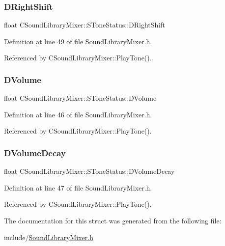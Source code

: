 \subsubsection{\texorpdfstring{D\+Right\+Shift}{DRightShift}}
{\footnotesize\ttfamily float C\+Sound\+Library\+Mixer\+::\+S\+Tone\+Status\+::\+D\+Right\+Shift}



Definition at line 49 of file Sound\+Library\+Mixer.\+h.



Referenced by C\+Sound\+Library\+Mixer\+::\+Play\+Tone().

\hypertarget{structCSoundLibraryMixer_1_1SToneStatus_a95cb65bb95165b6ebaf236820ceefbc9}{}\label{structCSoundLibraryMixer_1_1SToneStatus_a95cb65bb95165b6ebaf236820ceefbc9} 
\subsubsection{\texorpdfstring{D\+Volume}{DVolume}}
{\footnotesize\ttfamily float C\+Sound\+Library\+Mixer\+::\+S\+Tone\+Status\+::\+D\+Volume}



Definition at line 46 of file Sound\+Library\+Mixer.\+h.



Referenced by C\+Sound\+Library\+Mixer\+::\+Play\+Tone().

\hypertarget{structCSoundLibraryMixer_1_1SToneStatus_aa4b4dcadb27364e176769e4f0b15a6c9}{}\label{structCSoundLibraryMixer_1_1SToneStatus_aa4b4dcadb27364e176769e4f0b15a6c9} 
\subsubsection{\texorpdfstring{D\+Volume\+Decay}{DVolumeDecay}}
{\footnotesize\ttfamily float C\+Sound\+Library\+Mixer\+::\+S\+Tone\+Status\+::\+D\+Volume\+Decay}



Definition at line 47 of file Sound\+Library\+Mixer.\+h.



Referenced by C\+Sound\+Library\+Mixer\+::\+Play\+Tone().



The documentation for this struct was generated from the following file\+:\begin{DoxyCompactItemize}
\item 
include/\hyperlink{SoundLibraryMixer_8h}{Sound\+Library\+Mixer.\+h}\end{DoxyCompactItemize}
